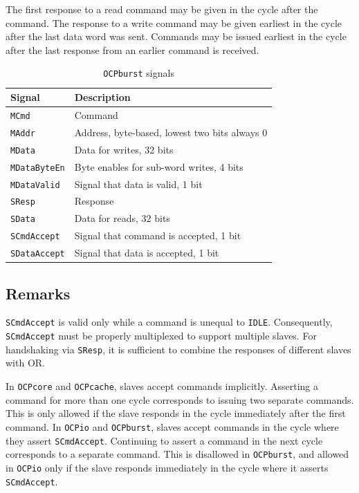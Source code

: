 \documentclass[a4paper,fontsize=10pt,twoside,DIV15,BCOR12mm,headinclude=true,footinclude=false,pagesize,bibtotoc]{scrbook}
\newcommand{\code}[1]{{\texttt{#1}}}
\newcommand{\comment}[3]{

\textsf{\textbf{#1}} {\color{#3}#2}}
\newcommand{\wolf}[1]{\comment{Wolfgang}{#1}{OliveGreen}}
\newcommand{\martin}[1]{\comment{Martin}{#1}{Blue}}
\renewcommand{\wolf}[1]{}
\renewcommand{\martin}[1]{}
\begin{document}
The first response to a read command may be given in the cycle after
the command. The response to a write command may be given earliest in
the cycle after the last data word was sent. Commands may be issued
earliest in the cycle after the last response from an earlier command
is received.
\martin{Having a write response one cycle after the last data and not
allowing a command in that cycle costs us one additional clock cycle
(in the TDM slot). Maybe it doe not matter.}
\wolf{The consensus was that it would not matter. We could change it
  if we make sure all slaves comply, the restriction was basically just
  put in to be on the safe side.}

\begin{table}
  \centering
  \caption{\code{OCPburst} signals}
  \label{tab:burstsignals}
  \begin{tabular}{ll}
    \toprule
    Signal & Description \\
    \midrule
    \code{MCmd} & Command \\
    \code{MAddr} & Address, byte-based, lowest two bits always 0 \\
    \code{MData} & Data for writes, 32 bits \\
    \code{MDataByteEn} & Byte enables for sub-word writes, 4 bits \\
    \code{MDataValid} & Signal that data is valid, 1 bit \\
    \cmidrule{1-2}
    \code{SResp} & Response \\
    \code{SData} & Data for reads, 32 bits \\
    \code{SCmdAccept} & Signal that command is accepted, 1 bit \\
    \code{SDataAccept} & Signal that data is accepted, 1 bit \\
    \bottomrule
  \end{tabular}
\end{table}

\subsection{Remarks}

\code{SCmdAccept} is valid only while a command is unequal to
\code{IDLE}. Consequently, \code{SCmdAccept} must be properly
multiplexed to support multiple slaves. For handshaking via
\code{SResp}, it is sufficient to combine the responses of different
slaves with OR.

In \code{OCPcore} and \code{OCPcache}, slaves accept commands
implicitly. Asserting a command for more than one cycle corresponds to
issuing two separate commands. This is only allowed if the slave
responds in the cycle immediately after the first command. In
\code{OCPio} and \code{OCPburst}, slaves accept commands in the cycle
where they assert \code{SCmdAccept}. Continuing to assert a command in
the next cycle corresponds to a separate command. This is disallowed
in \code{OCPburst}, and allowed in \code{OCPio} only if the slave
responds immediately in the cycle where it asserts \code{SCmdAccept}.
\end{document}
